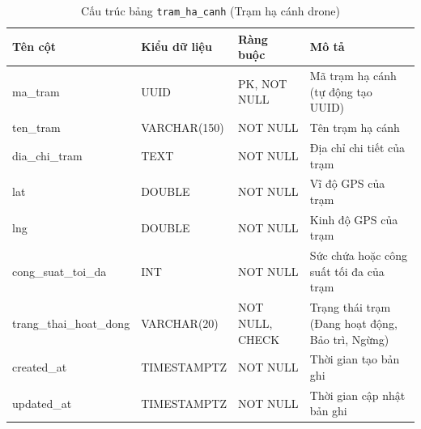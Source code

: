 \begin{table}[H]
  \centering
  \begin{tabularx}{\textwidth}{|l|l|l|>{\raggedright\arraybackslash}X|}
    \hline
    \textbf{Tên cột} & \textbf{Kiểu dữ liệu} & \textbf{Ràng buộc} & \textbf{Mô tả} \\
    \hline
    ma\_tram             & UUID            & PK, NOT NULL    & Mã trạm hạ cánh (tự động tạo UUID) \\ \hline
    ten\_tram            & VARCHAR(150)    & NOT NULL        & Tên trạm hạ cánh \\ \hline
    dia\_chi\_tram       & TEXT            & NOT NULL        & Địa chỉ chi tiết của trạm \\ \hline
    lat                  & DOUBLE          & NOT NULL        & Vĩ độ GPS của trạm \\ \hline
    lng                  & DOUBLE          & NOT NULL        & Kinh độ GPS của trạm \\ \hline
    cong\_suat\_toi\_da  & INT             & NOT NULL        & Sức chứa hoặc công suất tối đa của trạm \\ \hline
    trang\_thai\_hoat\_dong & VARCHAR(20)     & NOT NULL, CHECK & Trạng thái trạm (Đang hoạt động, Bảo trì, Ngừng) \\ \hline
    created\_at          & TIMESTAMPTZ     & NOT NULL        & Thời gian tạo bản ghi \\ \hline
    updated\_at          & TIMESTAMPTZ     & NOT NULL        & Thời gian cập nhật bản ghi \\
    \hline
  \end{tabularx}
  \caption{Cấu trúc bảng \texttt{tram\_ha\_canh} (Trạm hạ cánh drone)}
  \label{tab:db-tram-ha-canh}
\end{table}

